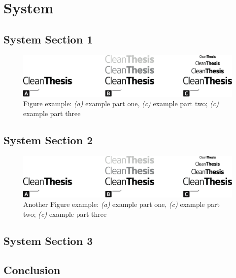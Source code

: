 %
\chapter{System}
\label{sec:system}



\section{System Section 1}
\label{sec:system:sec1}


\begin{figure}[htb]
	\includegraphics[width=\textwidth]{Bilder/Clean-Thesis-Figure}
	\caption{Figure example: \textit{(a)} example part one, \textit{(c)} example part two; \textit{(c)} example part three}
	\label{fig:system:example1}
\end{figure}


\section{System Section 2}
\label{sec:system:sec2}


\begin{figure}[htb]
	\includegraphics[width=\textwidth]{Bilder/Clean-Thesis-Figure}
	\caption{Another Figure example: \textit{(a)} example part one, \textit{(c)} example part two; \textit{(c)} example part three}
	\label{fig:system:example2}
\end{figure}


\section{System Section 3}
\label{sec:system:sec3}


\section{Conclusion}
\label{sec:system:conclusion}


